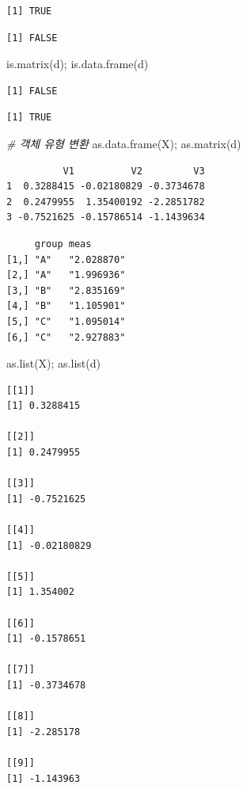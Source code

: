 \documentclass[
  11pt,
]{krantz}
\newenvironment{Shaded}{\begin{snugshade}}{\end{snugshade}}
\newcommand{\CommentTok}[1]{\textcolor[rgb]{0.37,0.37,0.37}{\textit{#1}}}
\newcommand{\FunctionTok}[1]{\textcolor[rgb]{0,0,0}{#1}}
\newcommand{\NormalTok}[1]{#1}
\begin{document}
\begin{verbatim}
[1] TRUE
\end{verbatim}

\begin{verbatim}
[1] FALSE
\end{verbatim}

\begin{Shaded}
\begin{Highlighting}[]
\FunctionTok{is.matrix}\NormalTok{(d); }\FunctionTok{is.data.frame}\NormalTok{(d)}
\end{Highlighting}
\end{Shaded}

\begin{verbatim}
[1] FALSE
\end{verbatim}

\begin{verbatim}
[1] TRUE
\end{verbatim}

\begin{Shaded}
\begin{Highlighting}[]
\CommentTok{\# 객체 유형 변환}
\FunctionTok{as.data.frame}\NormalTok{(X); }\FunctionTok{as.matrix}\NormalTok{(d)}
\end{Highlighting}
\end{Shaded}

\begin{verbatim}
          V1          V2         V3
1  0.3288415 -0.02180829 -0.3734678
2  0.2479955  1.35400192 -2.2851782
3 -0.7521625 -0.15786514 -1.1439634
\end{verbatim}

\begin{verbatim}
     group meas      
[1,] "A"   "2.028870"
[2,] "A"   "1.996936"
[3,] "B"   "2.835169"
[4,] "B"   "1.105901"
[5,] "C"   "1.095014"
[6,] "C"   "2.927883"
\end{verbatim}

\begin{Shaded}
\begin{Highlighting}[]
\FunctionTok{as.list}\NormalTok{(X); }\FunctionTok{as.list}\NormalTok{(d)}
\end{Highlighting}
\end{Shaded}

\begin{verbatim}
[[1]]
[1] 0.3288415

[[2]]
[1] 0.2479955

[[3]]
[1] -0.7521625

[[4]]
[1] -0.02180829

[[5]]
[1] 1.354002

[[6]]
[1] -0.1578651

[[7]]
[1] -0.3734678

[[8]]
[1] -2.285178

[[9]]
[1] -1.143963
\end{verbatim}
\end{document}
